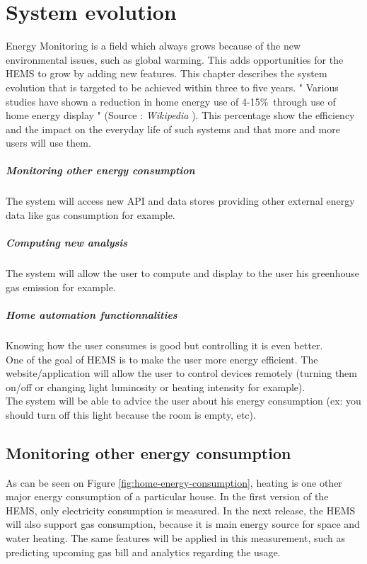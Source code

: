 \chapter{System evolution}
\label{ch:evolution}
Energy Monitoring is a field which always grows because of the new environmental issues, such as global warming. This adds opportunities for the HEMS to grow by adding new features. This chapter describes the system evolution that is targeted to be achieved within three to five years.
" Various studies have shown a reduction in home energy use of 4-15\%\ through use of home energy display " (Source : \textit{Wikipedia} ). This percentage show the efficiency and the impact on the everyday life of such systems and that more and more users will use them. 

 \paragraph{Monitoring other energy consumption}
 The system will access new API and data stores providing other external energy data like gas consumption for example. 

 \paragraph{Computing new analysis}
The system will allow the user to compute and display to the user his greenhouse gas emission for example.

 \paragraph{Home automation functionnalities}
Knowing how the user consumes is good but controlling it is even better. \\ One of the goal of HEMS is to make the user more energy efficient.
The website/application will allow the user to control devices remotely (turning them on/off or changing light luminosity or heating intensity for example). \\
The system will be able to advice the user about his energy consumption (ex: you should turn off this light because the room is empty, etc).



\section{Monitoring other energy consumption}
As can be seen on Figure \ref{fig:home-energy-consumption}, heating is one other major energy consumption of a particular house. In the first version of the HEMS, only electricity consumption is measured. In the next release, the HEMS will also support gas consumption, because it is main energy source for space and water heating. The same features will be applied in this measurement, such as predicting upcoming gas bill and analytics regarding the usage.

